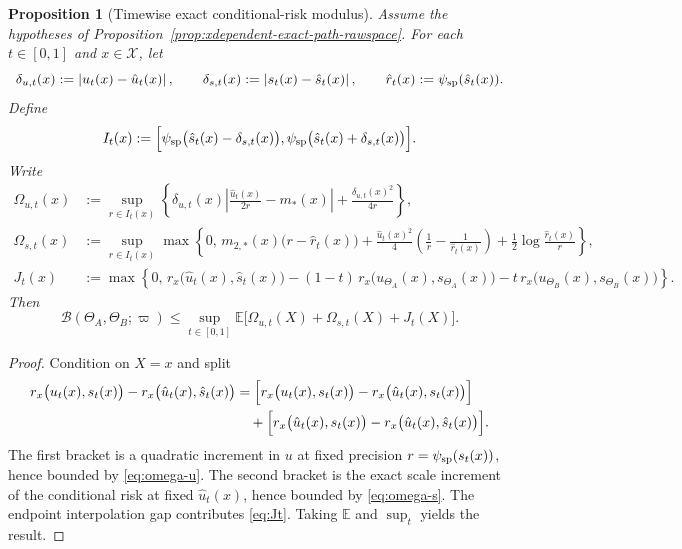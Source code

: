 \documentclass[11pt]{article}
\newtheorem{proposition}{Proposition}
\newcommand{\E}{\mathbb{E}}
\newcommand{\abs}[1]{\left\lvert #1 \right\rvert}
\newcommand{\cB}{\mathcal{B}}
\begin{document}
\begin{proposition}[Timewise exact conditional-risk modulus]
\label{prop:timewise-exact-condrisk-modulus}
Assume the hypotheses of Proposition~\ref{prop:xdependent-exact-path-rawspace}.
For each $t\in[0,1]$ and $x\in\mathcal X$, let
\[
  \delta_{u,t}(x):=\abs{u_t(x)-\hat u_t(x)},
  \qquad
  \delta_{s,t}(x):=\abs{s_t(x)-\hat s_t(x)},
  \qquad
  \hat r_t(x):=\psi_{\rm sp}(\hat s_t(x)).
\]
Define
\[
  I_t(x):=
  \Bigl[
    \psi_{\rm sp}\bigl(\hat s_t(x)-\delta_{s,t}(x)\bigr),
    \psi_{\rm sp}\bigl(\hat s_t(x)+\delta_{s,t}(x)\bigr)
  \Bigr].
\]
Write
\begin{align}
  \Omega_{u,t}(x)
  &:=
  \sup_{r\in I_t(x)}
  \left\{
    \delta_{u,t}(x)\abs{\frac{\hat u_t(x)}{2r}-m_\ast(x)}
    +
    \frac{\delta_{u,t}(x)^2}{4r}
  \right\},
  \label{eq:omega-u}
  \\
  \Omega_{s,t}(x)
  &:=
  \sup_{r\in I_t(x)}
  \max\left\{
    0,\,
    m_{2,\ast}(x)\bigl(r-\hat r_t(x)\bigr)
    +
    \frac{\hat u_t(x)^2}{4}
    \left(
      \frac{1}{r}-\frac{1}{\hat r_t(x)}
    \right)
    +
    \frac{1}{2}\log\frac{\hat r_t(x)}{r}
  \right\},
  \label{eq:omega-s}
  \\
  J_t(x)
  &:=
  \max\left\{
    0,\,
    r_x\bigl(\hat u_t(x),\hat s_t(x)\bigr)
    -
    (1-t)\,r_x\bigl(u_{\Theta_A}(x),s_{\Theta_A}(x)\bigr)
    -
    t\,r_x\bigl(u_{\Theta_B}(x),s_{\Theta_B}(x)\bigr)
  \right\}.
  \label{eq:Jt}
\end{align}
Then
\begin{equation}
  \cB(\Theta_A,\Theta_B;\varpi)
  \le
  \sup_{t\in[0,1]}
  \E\bigl[
    \Omega_{u,t}(X)+\Omega_{s,t}(X)+J_t(X)
  \bigr].
  \label{eq:timewise-exact-condrisk-modulus}
\end{equation}
\end{proposition}

\begin{proof}
Condition on $X=x$ and split
\begin{align*}
  r_x\bigl(u_t(x),s_t(x)\bigr)-r_x\bigl(\hat u_t(x),\hat s_t(x)\bigr)
  &=
  \Bigl[
    r_x\bigl(u_t(x),s_t(x)\bigr)-r_x\bigl(\hat u_t(x),s_t(x)\bigr)
  \Bigr]
  \\
  &\quad+
  \Bigl[
    r_x\bigl(\hat u_t(x),s_t(x)\bigr)-r_x\bigl(\hat u_t(x),\hat s_t(x)\bigr)
  \Bigr].
\end{align*}
The first bracket is a quadratic increment in $u$ at fixed precision
$r=\psi_{\rm sp}(s_t(x))$, hence bounded by \eqref{eq:omega-u}. The second
bracket is the exact scale increment of the conditional risk at fixed
$\hat u_t(x)$, hence bounded by \eqref{eq:omega-s}. The endpoint interpolation
gap contributes \eqref{eq:Jt}. Taking $\E$ and $\sup_t$ yields the result.
\end{proof}
\end{document}
